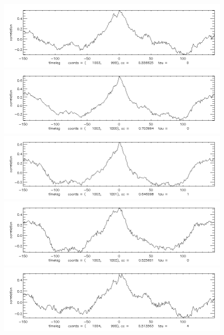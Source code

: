 \documentclass[12pt]{article}
\begin{document}
\begin{figure}[here]
\includegraphics[width=7in]{cc26.png}
\includegraphics[width=7in]{cc27.png}
\includegraphics[width=7in]{cc28.png}
\includegraphics[width=7in]{cc29.png}
\includegraphics[width=7in]{cc30.png}
\end{figure}
\newpage
\end{document}
